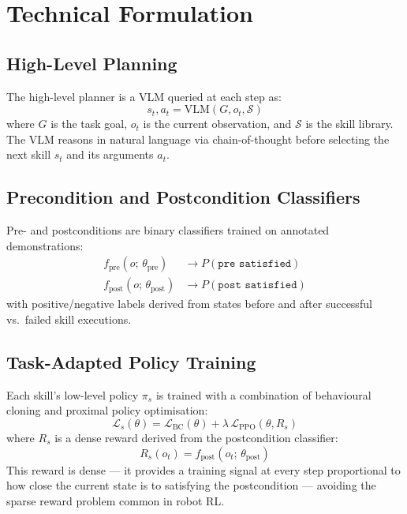 \documentclass[10pt,twocolumn]{article}
\begin{document}
\section{Technical Formulation}

\subsection{High-Level Planning}

The high-level planner is a VLM queried at each step as:
\begin{equation}
  s_t, a_t = \mathrm{VLM}(G, o_t, \mathcal{S})
\end{equation}
where $G$ is the task goal, $o_t$ is the current observation, and
$\mathcal{S}$ is the skill library. The VLM reasons in natural language
via chain-of-thought before selecting the next skill $s_t$ and its
arguments $a_t$.

\subsection{Precondition and Postcondition Classifiers}

Pre- and postconditions are binary classifiers trained on annotated
demonstrations:
\begin{align}
  f_\mathrm{pre}(o;\,\theta_\mathrm{pre}) &\to P(\texttt{pre satisfied}) \\
  f_\mathrm{post}(o;\,\theta_\mathrm{post}) &\to P(\texttt{post satisfied})
\end{align}
with positive/negative labels derived from states before and after
successful vs.\ failed skill executions.

\subsection{Task-Adapted Policy Training}

Each skill's low-level policy $\pi_s$ is trained with a combination of
behavioural cloning and proximal policy optimisation:
\[
  \mathcal{L}_s(\theta) = \mathcal{L}_\mathrm{BC}(\theta)
  + \lambda\, \mathcal{L}_\mathrm{PPO}(\theta, R_s)
\]
where $R_s$ is a dense reward derived from the postcondition classifier:
\[
  R_s(o_t) = f_\mathrm{post}(o_t;\,\theta_\mathrm{post})
\]
This reward is dense --- it provides a training signal at every step
proportional to how close the current state is to satisfying the
postcondition --- avoiding the sparse reward problem common in robot RL.
\end{document}
